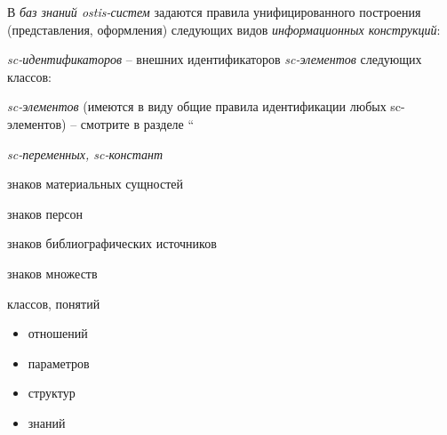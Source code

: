 \begin{SCn}
\begin{scnsubstruct}
{            В \textit{баз знаний ostis-систем} задаются правила унифицированного построения
            (представления, оформления) следующих видов \textit{информационных
                конструкций}:
            \begin{scnitemize}
                \item{\textit{sc-идентификаторов} -- внешних идентификаторов
                            \textit{sc-элементов} следующих классов:
                            \begin{scnitemizeii}
                                \item{\textit{sc-элементов} (имеются в виду общие правила идентификации
                                            любых sc-элементов) -- смотрите в разделе ``}
                                \item{\textit{sc-переменных, sc-констант}}
                                \item{знаков материальных сущностей
                                            \begin{scnitemizeiii}
                                                \item{знаков персон}
                                                \item{знаков библиографических источников}
                                            \end{scnitemizeiii}}
                                \item{знаков множеств
                                            \begin{scnitemizeiii}
                                                \item{классов, понятий
                                                            \begin{itemize}
                                                                \item{отношений}
                                                                \item{параметров}
                                                                \item{структур}
                                                                \item{знаний}
                                                            \end{itemize}
                                                      }
                                            \end{scnitemizeiii}}

\end{scnitemizeii}}
\end{scnitemize}}
\end{scnsubstruct}
\end{SCn}
